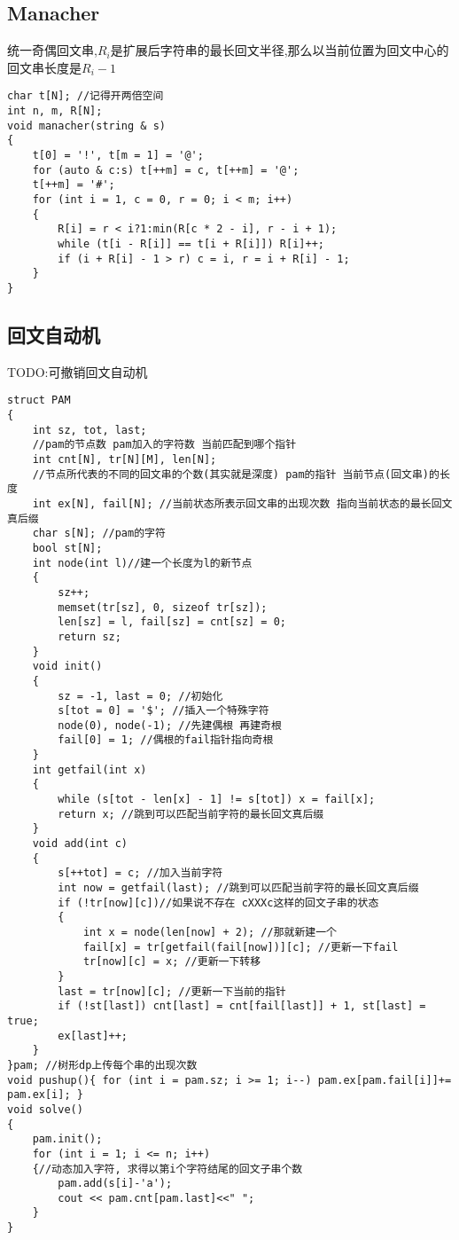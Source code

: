 \documentclass[a4paper,fontset=none]{ctexart}
\begin{document}
\subsection{Manacher}

统一奇偶回文串,$R_i$是扩展后字符串的最长回文半径,那么以当前位置为回文中心的回文串长度是$R_i-1$

\begin{verbatim}
char t[N]; //记得开两倍空间
int n, m, R[N];
void manacher(string & s)
{
    t[0] = '!', t[m = 1] = '@';
    for (auto & c:s) t[++m] = c, t[++m] = '@';
    t[++m] = '#';
    for (int i = 1, c = 0, r = 0; i < m; i++)
    {
        R[i] = r < i?1:min(R[c * 2 - i], r - i + 1);
        while (t[i - R[i]] == t[i + R[i]]) R[i]++;
        if (i + R[i] - 1 > r) c = i, r = i + R[i] - 1;
    }
}
\end{verbatim}
\subsection{回文自动机}

TODO:可撤销回文自动机

\begin{verbatim}
struct PAM
{
    int sz, tot, last;
    //pam的节点数 pam加入的字符数 当前匹配到哪个指针
    int cnt[N], tr[N][M], len[N];
    //节点所代表的不同的回文串的个数(其实就是深度) pam的指针 当前节点(回文串)的长度
    int ex[N], fail[N]; //当前状态所表示回文串的出现次数 指向当前状态的最长回文真后缀
    char s[N]; //pam的字符
    bool st[N];
    int node(int l)//建一个长度为l的新节点
    {
        sz++;
        memset(tr[sz], 0, sizeof tr[sz]);
        len[sz] = l, fail[sz] = cnt[sz] = 0;
        return sz;
    }
    void init()
    {
        sz = -1, last = 0; //初始化
        s[tot = 0] = '$'; //插入一个特殊字符
        node(0), node(-1); //先建偶根 再建奇根
        fail[0] = 1; //偶根的fail指针指向奇根
    }
    int getfail(int x)
    {
        while (s[tot - len[x] - 1] != s[tot]) x = fail[x];
        return x; //跳到可以匹配当前字符的最长回文真后缀
    }
    void add(int c)
    {
        s[++tot] = c; //加入当前字符
        int now = getfail(last); //跳到可以匹配当前字符的最长回文真后缀
        if (!tr[now][c])//如果说不存在 cXXXc这样的回文子串的状态
        {
            int x = node(len[now] + 2); //那就新建一个
            fail[x] = tr[getfail(fail[now])][c]; //更新一下fail
            tr[now][c] = x; //更新一下转移
        }
        last = tr[now][c]; //更新一下当前的指针
        if (!st[last]) cnt[last] = cnt[fail[last]] + 1, st[last] = true;
        ex[last]++;
    }
}pam; //树形dp上传每个串的出现次数
void pushup(){ for (int i = pam.sz; i >= 1; i--) pam.ex[pam.fail[i]]+= pam.ex[i]; }
void solve()
{
    pam.init();
    for (int i = 1; i <= n; i++)
    {//动态加入字符, 求得以第i个字符结尾的回文子串个数
        pam.add(s[i]-'a');
        cout << pam.cnt[pam.last]<<" ";
    }
}
\end{verbatim}
\end{document}
